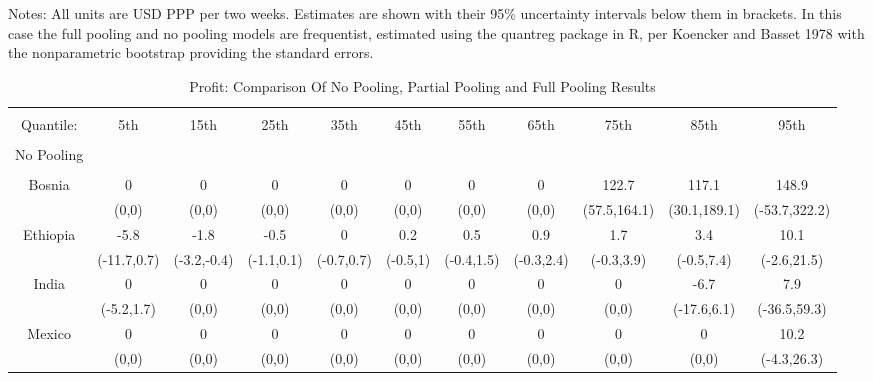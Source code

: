 \documentclass[english,12pt]{article}\usepackage{lmodern}
\numberwithin{equation}{section}
\begin{document}
\begin{landscape}
\begin{table}[!htbp]
\begin{tabular}{@{\extracolsep{5pt}} ccccccccccc}
\end{tabular}
\raggedright{\small Notes: All units are USD PPP per two weeks. Estimates are shown with their 95\% uncertainty intervals below them in brackets. In this case the full pooling and no pooling models are frequentist, estimated using the quantreg package in R, per Koencker and Basset 1978 with the nonparametric bootstrap providing the standard errors.}

\end{table}

\end{landscape}




\clearpage
\newpage
\singlespacing
\begin{landscape}
\begin{table}[!htbp] \centering
  \caption{Profit: Comparison Of No Pooling, Partial Pooling and Full Pooling Results}
  \label{big profit table}
  \scriptsize
\begin{tabular}{@{\extracolsep{5pt}} ccccccccccc}
\\[-1.8ex]\hline
\hline \\[-1.8ex]
 Quantile: & 5th & 15th & 25th & 35th & 45th & 55th & 65th & 75th & 85th & 95th \\
\hline \\[-1.8ex]
No Pooling &&&&&&&&&& \\
\hline \\[-1.8ex]
 Bosnia & 0 & 0 & 0 & 0 & 0 & 0 & 0 & 122.7 & 117.1 & 148.9 \\
& (0,0) & (0,0) & (0,0) & (0,0) & (0,0) & (0,0) & (0,0) & (57.5,164.1) & (30.1,189.1) & (-53.7,322.2) \\
 Ethiopia & -5.8 & -1.8 & -0.5 & 0 & 0.2 & 0.5 & 0.9 & 1.7 & 3.4 & 10.1 \\
& (-11.7,0.7) & (-3.2,-0.4) & (-1.1,0.1) & (-0.7,0.7) & (-0.5,1) & (-0.4,1.5) & (-0.3,2.4) & (-0.3,3.9) & (-0.5,7.4) & (-2.6,21.5) \\
 India & 0 & 0 & 0 & 0 & 0 & 0 & 0 & 0 & -6.7 & 7.9 \\
 & (-5.2,1.7) & (0,0) & (0,0) & (0,0) & (0,0) & (0,0) & (0,0) & (0,0) & (-17.6,6.1) & (-36.5,59.3) \\
 Mexico & 0 & 0 & 0 & 0 & 0 & 0 & 0 & 0 & 0 & 10.2 \\
 & (0,0) & (0,0) & (0,0) & (0,0) & (0,0) & (0,0) & (0,0) & (0,0) & (0,0) & (-4.3,26.3) \\

\end{tabular}
\end{table}
\end{landscape}
\end{document}
